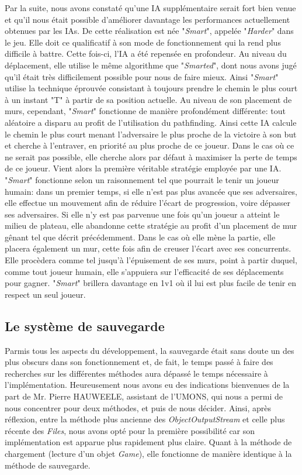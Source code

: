 \documentclass[a4paper, 12pt]{article}
\begin{document}
Par la suite, nous avons constaté qu'une IA supplémentaire serait fort bien venue et qu'il nous était possible d'améliorer davantage les performances actuellement obtenues par les IAs. De cette réalisation est née "\textit{Smart}", appelée "\textit{Harder}" dans le jeu. Elle doit ce qualificatif à son mode de fonctionnement qui la rend plus difficile à battre.
Cette fois-ci, l'IA a été repensée en profondeur. Au niveau du déplacement, elle utilise le même algorithme que "\textit{Smarted}", dont nous avons jugé qu'il était très difficilement possible pour nous de faire mieux. Ainsi "\textit{Smart}" utilise la technique éprouvée consistant à toujours prendre le chemin le plus court à un instant "T" à partir de sa position actuelle. Au niveau de son placement de murs, cependant, "\textit{Smart}" fonctionne de manière profondément différente: tout aléatoire a disparu au profit de l'utilisation du pathfinding. Ainsi cette IA calcule le chemin le plus court menant l'adversaire le plus proche de la victoire à son but et cherche à l'entraver, en priorité au plus proche de ce joueur. Dans le cas où ce ne serait pas possible, elle cherche alors par défaut à maximiser la perte de temps de ce joueur.
Vient alors la première véritable stratégie employée par une IA. "\textit{Smart}" fonctionne selon un raisonnement tel que pourrait le tenir un joueur humain: dans un premier temps, si elle n'est pas plus avancée que ses adversaires, elle effectue un mouvement afin de réduire l'écart de progression, voire dépasser ses adversaires. Si elle n'y est pas parvenue une fois qu'un joueur a atteint le milieu de plateau, elle abandonne cette stratégie au profit d'un placement de mur gênant tel que décrit précédemment. Dans le cas où elle mène la partie, elle placera également un mur, cette fois afin de creuser l'écart avec ses concurrents. Elle procèdera comme tel jusqu'à l'épuisement de ses murs, point à partir duquel, comme tout joueur humain, elle s'appuiera sur l'efficacité de ses déplacements pour gagner.
"\textit{Smart}" brillera davantage en 1v1 où il lui est plus facile de tenir en respect un seul joueur.

\subsection{Le système de sauvegarde}
Parmis tous les aspects du développement, la sauvegarde était sans doute un des plus obscurs dans son fonctionnement et, de fait, le temps passé à faire des recherches sur les différentes méthodes aura dépassé le temps nécessaire à l’implémentation. Heureusement nous avons eu des indications bienvenues de la part de Mr. Pierre HAUWEELE, assistant de l’UMONS, qui nous a permi de nous concentrer pour deux méthodes, et puis de nous décider. Ainsi, après réflexion, entre la méthode plus ancienne des \textit{ObjectOutputStream} et celle plus récente des \textit{Files}, nous avons opté pour la première possibilité car son implémentation est apparue plus rapidement plus claire. Quant à la méthode de chargement (lecture d’un objet \textit{Game}), elle fonctionne de manière identique à la méthode de sauvegarde.
\end{document}

